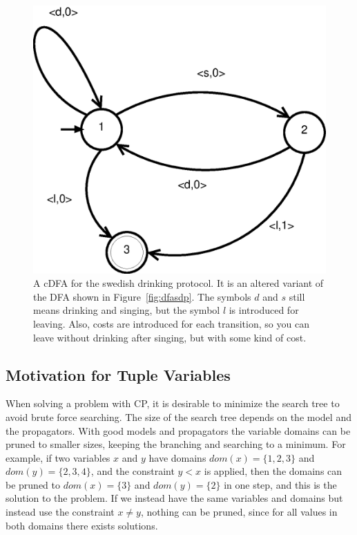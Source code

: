 \documentclass[a4paper,11pt]{article}
\begin{document}
\begin{figure}[H]
\centering
\includegraphics[scale=0.6]{cdfa.eps}
\caption{A cDFA for the swedish drinking protocol. It is an altered variant of the DFA shown in Figure~\ref{fig:dfasdp}. The symbols $d$ and $s$ still means drinking and singing, but the symbol $l$ is introduced for leaving. Also, costs are introduced for each transition, so you can leave without drinking after singing, but with some kind of cost.}
\label{fig:cdfasdp}
\end{figure}

\subsection{Motivation for Tuple Variables}
When solving a problem with CP, it is desirable to minimize the search tree to avoid brute force searching. The size of the search tree depends on the model and the propagators. With good models and propagators the variable domains can be pruned to smaller sizes, keeping the branching and searching to a minimum. For example, if two variables $x$ and $y$ have domains $dom(x)=\{1,2,3\}$ and $dom(y)=\{2,3,4\}$, and the constraint $y<x$ is applied, then the domains can be pruned to $dom(x)=\{3\}$ and $dom(y)=\{2\}$ in one step, and this is the solution to the problem. If we instead have the same variables and domains but instead use the constraint $x\neq y$, nothing can be pruned, since for all values in both domains there exists solutions. 
\end{document}
